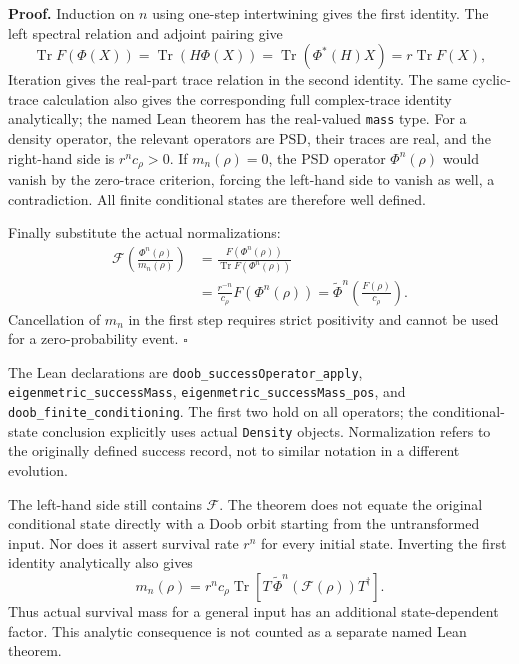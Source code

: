 \documentclass[
  11pt,
  oneside]{book}
\begin{document}
\textbf{Proof.} Induction on \(n\) using one-step intertwining gives the
first identity. The left spectral relation and adjoint pairing give \[
\operatorname{Tr}F(\Phi(X))
=\operatorname{Tr}(H\Phi(X))
=\operatorname{Tr}(\Phi^*(H)X)
=r\operatorname{Tr}F(X),
\] Iteration gives the real-part trace relation in the second identity.
The same cyclic-trace calculation also gives the corresponding full
complex-trace identity analytically; the named Lean theorem has the
real-valued \texttt{mass} type. For a density operator, the relevant
operators are PSD, their traces are real, and the right-hand side is
\(r^nc_\rho>0\). If \(m_n(\rho)=0\), the PSD operator \(\Phi^n(\rho)\)
would vanish by the zero-trace criterion, forcing the left-hand side to
vanish as well, a contradiction. All finite conditional states are
therefore well defined.

Finally substitute the actual normalizations: \[
\begin{aligned}
\mathcal F\!\left(\frac{\Phi^n(\rho)}{m_n(\rho)}\right)
&=\frac{F(\Phi^n(\rho))}{\operatorname{Tr}F(\Phi^n(\rho))}\\
&=\frac{r^{-n}}{c_\rho}F(\Phi^n(\rho))
=\widetilde\Phi^n\!\left(\frac{F(\rho)}{c_\rho}\right).
\end{aligned}
\] Cancellation of \(m_n\) in the first step requires strict positivity
and cannot be used for a zero-probability event. \(\square\)

The Lean declarations are \texttt{doob\_\allowbreak success\allowbreak Operator\_\allowbreak apply},
\texttt{eigenmetric\_\allowbreak success\allowbreak Mass},
\texttt{eigenmetric\_\allowbreak success\allowbreak Mass\_\allowbreak pos}, and
\texttt{doob\_\allowbreak finite\_\allowbreak conditioning}. The first two hold on all
operators; the conditional-state conclusion explicitly uses actual
\texttt{Density} objects. Normalization refers to the originally defined
success record, not to similar notation in a different evolution.

The left-hand side still contains \(\mathcal F\). The theorem does not
equate the original conditional state directly with a Doob orbit
starting from the untransformed input. Nor does it assert survival rate
\(r^n\) for every initial state. Inverting the first identity
analytically also gives \[
m_n(\rho)=r^nc_\rho\operatorname{Tr}\!\left[
T\,\widetilde\Phi^n(\mathcal F(\rho))T^\dagger\right].
\] Thus actual survival mass for a general input has an additional
state-dependent factor. This analytic consequence is not counted as a
separate named Lean theorem.
\end{document}
